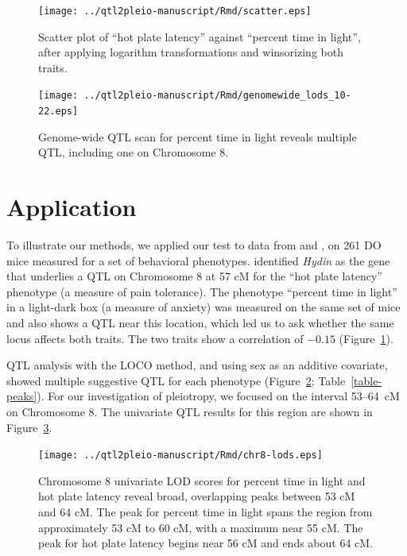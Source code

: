 \documentclass[oneside]{book}\usepackage[]{graphicx}\usepackage[]{color}
\begin{document}
\clearpage



\begin{figure}
\texttt{[image: ../qtl2pleio-manuscript/Rmd/scatter.eps]}
\caption{Scatter plot of ``hot plate latency'' against ``percent time in
  light'', after applying logarithm transformations and winsorizing
  both traits.}
\label{fig:scatter}
\end{figure}


\begin{figure}
\texttt{[image: ../qtl2pleio-manuscript/Rmd/genomewide\_lods\_10-22.eps]}
\caption{Genome-wide QTL scan for percent time in light reveals
  multiple QTL, including one on Chromosome 8.}
\label{fig:genomewide10-22}
\end{figure}



\section{Application}
\label{sec:app}

To illustrate our methods, we applied our test to data from
\citet{logan2013high} and \citet{recla2014precise}, on 261 DO mice
measured for a set of behavioral phenotypes.
\citet{recla2014precise} identified \textit{Hydin} as the gene that
underlies a QTL on Chromosome 8 at 57 cM for the ``hot plate latency''
phenotype (a measure of pain tolerance). The phenotype ``percent time in light''
in a light-dark box (a measure of anxiety) was
measured on the same set of mice \citep{logan2013high} and also shows a QTL near
this location, which led us to ask whether the same locus affects both traits.
The two traits show a correlation of $-0.15$ (Figure~\ref{fig:scatter}).

QTL analysis with the LOCO method, and using sex as an additive
covariate, showed multiple suggestive QTL for each
phenotype (Figure~\ref{fig:genomewide10-22}; Table~\ref{table-peaks}). For our investigation of
pleiotropy, we focused on the interval 53--64~cM on Chromosome 8.
The univariate QTL results for this region are shown in
Figure~\ref{fig:chr8-lod}.

\begin{figure}
\texttt{[image: ../qtl2pleio-manuscript/Rmd/chr8-lods.eps]}
\caption{Chromosome 8 univariate LOD scores for percent time in light
  and hot plate latency reveal broad, overlapping peaks between 53 cM
  and 64 cM. The peak for percent time in light spans the region from
  approximately 53 cM to 60 cM, with a maximum near 55 cM. The peak
  for hot plate latency begins near 56 cM and ends about 64 cM.}
\label{fig:chr8-lod}
\end{figure}
\end{document}
